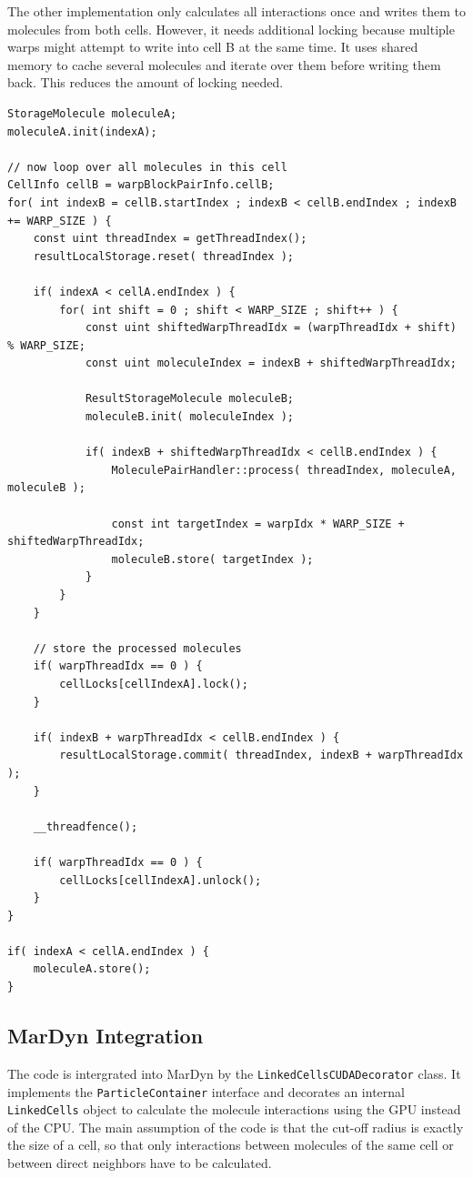 The other implementation only calculates all interactions once and writes them to molecules from both cells. However, it needs additional locking because multiple warps might attempt to write into cell B at the same time. It uses shared memory to cache several molecules and iterate over them before writing them back. This reduces the amount of locking needed.

\begin{lstlisting}[caption=inter-cell block processing with shared memory cache(warp block cell processor)]
StorageMolecule moleculeA;
moleculeA.init(indexA);

// now loop over all molecules in this cell
CellInfo cellB = warpBlockPairInfo.cellB;
for( int indexB = cellB.startIndex ; indexB < cellB.endIndex ; indexB += WARP_SIZE ) {
	const uint threadIndex = getThreadIndex();
	resultLocalStorage.reset( threadIndex );

	if( indexA < cellA.endIndex ) {
		for( int shift = 0 ; shift < WARP_SIZE ; shift++ ) {
			const uint shiftedWarpThreadIdx = (warpThreadIdx + shift) % WARP_SIZE;
			const uint moleculeIndex = indexB + shiftedWarpThreadIdx;

			ResultStorageMolecule moleculeB;
			moleculeB.init( moleculeIndex );

			if( indexB + shiftedWarpThreadIdx < cellB.endIndex ) {
				MoleculePairHandler::process( threadIndex, moleculeA, moleculeB );

				const int targetIndex = warpIdx * WARP_SIZE + shiftedWarpThreadIdx;
				moleculeB.store( targetIndex );
			}
		}
	}

	// store the processed molecules
	if( warpThreadIdx == 0 ) {
		cellLocks[cellIndexA].lock();
	}

	if( indexB + warpThreadIdx < cellB.endIndex ) {
		resultLocalStorage.commit( threadIndex, indexB + warpThreadIdx );
	}

	__threadfence();

	if( warpThreadIdx == 0 ) {
		cellLocks[cellIndexA].unlock();
	}
}

if( indexA < cellA.endIndex ) {
	moleculeA.store();
}
\end{lstlisting}

\subsection{MarDyn Integration}
The \cuda{} code is intergrated into MarDyn by the \lstinline!LinkedCellsCUDADecorator! class. It implements the \lstinline!ParticleContainer! interface and decorates an internal \lstinline!LinkedCells! object to calculate the molecule interactions using the GPU instead of the CPU.
The main assumption of the code is that the cut-off radius is exactly the size of a cell, so that only interactions between molecules of the same cell or between direct neighbors have to be calculated.

